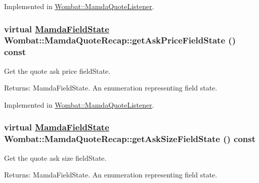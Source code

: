 Implemented in \hyperlink{classWombat_1_1MamdaQuoteListener_01e681d0b51718516807df702714f7ba}{Wombat::Mamda\-Quote\-Listener}.\hypertarget{classWombat_1_1MamdaQuoteRecap_6cb34263f4aa84f8bdb1d04f13257ff1}{
\subsubsection[getAskPriceFieldState]{\setlength{\rightskip}{0pt plus 5cm}virtual \hyperlink{namespaceWombat_93aac974f2ab713554fd12a1fa3b7d2a}{Mamda\-Field\-State} Wombat::Mamda\-Quote\-Recap::get\-Ask\-Price\-Field\-State () const}}
\label{classWombat_1_1MamdaQuoteRecap_6cb34263f4aa84f8bdb1d04f13257ff1}


Get the quote ask price field\-State. 

\begin{Desc}
\item[Returns:]Mamda\-Field\-State. An enumeration representing field state. \end{Desc}


Implemented in \hyperlink{classWombat_1_1MamdaQuoteListener_28dd174c3b718a3def1d09b04ab68577}{Wombat::Mamda\-Quote\-Listener}.\hypertarget{classWombat_1_1MamdaQuoteRecap_3df7e1b094a7efebea3cf9c388de7611}{
\subsubsection[getAskSizeFieldState]{\setlength{\rightskip}{0pt plus 5cm}virtual \hyperlink{namespaceWombat_93aac974f2ab713554fd12a1fa3b7d2a}{Mamda\-Field\-State} Wombat::Mamda\-Quote\-Recap::get\-Ask\-Size\-Field\-State () const}}
\label{classWombat_1_1MamdaQuoteRecap_3df7e1b094a7efebea3cf9c388de7611}


Get the quote ask size field\-State. 

\begin{Desc}
\item[Returns:]Mamda\-Field\-State. An enumeration representing field state. \end{Desc}


